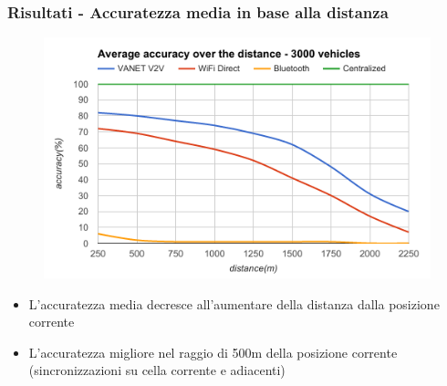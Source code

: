 \documentclass{beamer}
\begin{document}
\begin{frame}
  \frametitle{Risultati - Accuratezza media in base alla distanza}

      \begin{figure}
      \includegraphics[scale=0.4]{img/graphics/distance.png}
      \end{figure}
      \begin{itemize}
	\item  L'accuratezza media decresce all'aumentare della distanza dalla posizione corrente
	\item  L'accuratezza migliore nel raggio di 500m della posizione corrente (sincronizzazioni su cella corrente e adiacenti)
      \end{itemize}
 
\end{frame}
\end{document}

